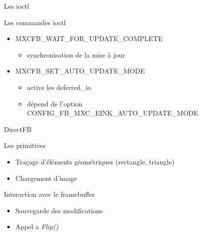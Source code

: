 \begin{frame}{Les ioctl}
	\begin{block} {Les commandes ioctl}
		\begin{itemize}
				\item MXCFB\_WAIT\_FOR\_UPDATE\_COMPLETE
			\begin{itemize}
				\item synchronisation de la mise à jour
			\end{itemize}
			\item MXCFB\_SET\_AUTO\_UPDATE\_MODE
			\begin{itemize}
				\item active les deferred\_io
				\item dépend de l'option CONFIG\_FB\_MXC\_EINK\_AUTO\_UPDATE\_MODE
			\end{itemize}
		\end{itemize}
	\end{block}
\end{frame}


\begin{frame}{DirectFB}
	\begin{block} { Les primitives }
		\begin{itemize}
			\item Traçage d'éléments géométriques (rectangle, triangle)
			\item Chargement d'image
		\end{itemize}
	\end{block}
	\begin{block} { Interaction avec le framebuffer }
		 \begin{itemize}
		 	\item Sauvegarde des modifications%
		 	\item Appel a \emph{Flip()} 
		 \end{itemize}
	\end{block}
\end{frame}
